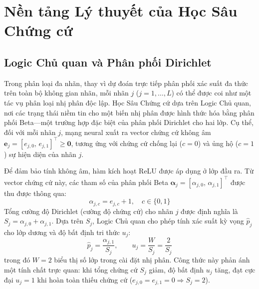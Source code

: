 \documentclass[conference]{IEEEtran}
\begin{document}
\section{Nền tảng Lý thuyết của Học Sâu Chứng cứ}

\subsection{Logic Chủ quan và Phân phối Dirichlet}
Trong phân loại đa nhãn, thay vì dự đoán trực tiếp phân phối xác suất đa thức trên toàn bộ không gian nhãn, mỗi nhãn $j$ ($j = 1, \dots, L$) có thể được coi như một tác vụ phân loại nhị phân độc lập. Học Sâu Chứng cứ dựa trên Logic Chủ quan, nơi các trạng thái niềm tin cho một biến nhị phân được hình thức hóa bằng phân phối Beta—một trường hợp đặc biệt của phân phối Dirichlet cho hai lớp. Cụ thể, đối với mỗi nhãn $j$, mạng neural xuất ra vector chứng cứ không âm $\mathbf{e}_j = [e_{j,0},\, e_{j,1}]^\top \ge \mathbf{0}$, tương ứng với chứng cứ chống lại ($c=0$) và ủng hộ ($c=1$) sự hiện diện của nhãn $j$.

Để đảm bảo tính không âm, hàm kích hoạt ReLU được áp dụng ở lớp đầu ra. Từ vector chứng cứ này, các tham số của phân phối Beta $\boldsymbol{\alpha}_j = [\alpha_{j,0},\, \alpha_{j,1}]^\top$ được thu được thông qua:
\begin{equation}
    \alpha_{j,c} = e_{j,c} + 1, \quad c \in \{0, 1\}
    \label{eq:alpha}
\end{equation}
Tổng cường độ Dirichlet (cường độ chứng cứ) cho nhãn $j$ được định nghĩa là $S_j = \alpha_{j,0} + \alpha_{j,1}$. Dựa trên $S_j$, Logic Chủ quan cho phép tính xác suất kỳ vọng $\hat{p}_j$ cho lớp dương và độ bất định tri thức $u_j$:
\begin{equation}
    \hat{p}_j = \frac{\alpha_{j,1}}{S_j}, \qquad u_j = \frac{W}{S_j} = \frac{2}{S_j}
    \label{eq:pu}
\end{equation}
trong đó $W = 2$ biểu thị số lớp trong cài đặt nhị phân. Công thức này phản ánh một tính chất trực quan: khi tổng chứng cứ $S_j$ giảm, độ bất định $u_j$ tăng, đạt cực đại $u_j = 1$ khi hoàn toàn thiếu chứng cứ ($e_{j,0} = e_{j,1} = 0 \Rightarrow S_j = 2$).
\end{document}
